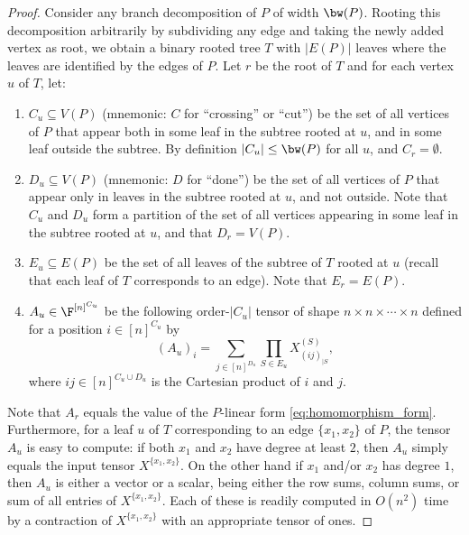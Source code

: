 \begin{proof}
  Consider any branch decomposition of $P$ of
  width $\bw(P)$.  Rooting this decomposition arbitrarily by subdividing
  any edge and taking the newly added vertex as root, we obtain a
  binary rooted tree $T$ with $|E(P)|$ leaves where the leaves are
  identified by the edges of $P$.  Let $r$ be the root of $T$ and
  for each vertex $u$ of $T$, let:
  \begin{enumerate}
  \item $C_u \subseteq V(P)$ (mnemonic: $C$ for ``crossing'' or ``cut'') be the set of
    all vertices of $P$ that appear both in some leaf in the subtree
    rooted at $u$, and in some leaf outside the subtree.  By
    definition $|C_u| \le \bw(P)$ for all $u$, and $C_r = \emptyset$.

  \item $D_u \subseteq V(P)$ (mnemonic: $D$ for ``done'') be the set of all vertices of $P$ that
    appear only in leaves in the subtree rooted at $u$, and not
    outside.  Note that $C_u$ and $D_u$ form a partition of the set of
    all vertices appearing in some leaf in the subtree rooted at $u$,
    and that $D_r = V(P)$.

  \item $E_u \subseteq E(P)$ be the set of all leaves of the subtree
    of $T$ rooted at $u$ (recall that each leaf of $T$ corresponds to
    an edge).  Note that $E_r = E(P)$.

  \item $A_u \in \F^{[n]^{C_u}}$ be the following %
%
order-$|C_u|$
%
   tensor
    of shape $n \times n \times \cdots \times n$ defined for a position $i \in [n]^{C_u}$ by
    \[
    (A_u)_i = \sum_{j \in [n]^{D_u}} \prod_{S \in E_u} X^{(S)}_{(ij)_{|S}},
    \]
    where $ij \in [n]^{C_u \cup D_u}$ is the Cartesian product of $i$
    and $j$.
  \end{enumerate}

  Note that $A_r$ equals the value of the $P$-linear
  form \eqref{eq:homomorphism_form}.
  Furthermore, for a leaf $u$ of $T$ corresponding to an edge $\{x_1, x_2\}$ of
  $P$,
  the tensor  %
  $A_u$ is easy to compute: if %
  both $x_1$ and $x_2$  %
  have degree
  at least $2$, then $A_u$ simply equals the input tensor
  $X^{\{x_1,x_2\}}$.  On the other hand if $x_1$ and/or $x_2$ has
  degree $1$, then $A_u$ is either a vector or a scalar, being either
  the row sums, column sums, or sum of all entries of
  $X^{\{x_1,x_2\}}$.  Each of these is readily computed in $O(n^2)$
  time by a contraction of $X^{\{x_1,x_2\}}$ with an appropriate
  tensor of ones.


\end{proof}
